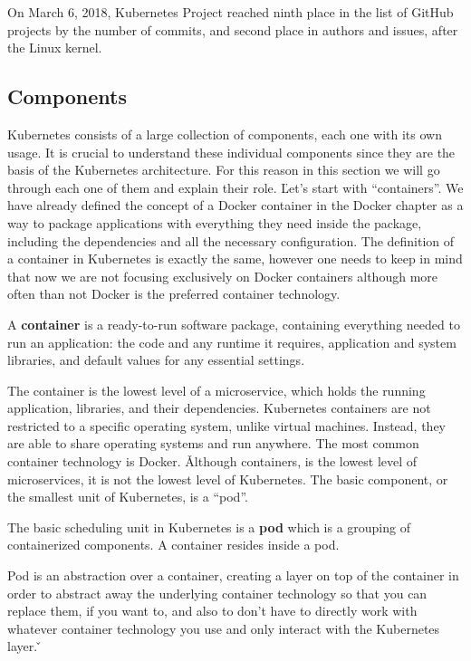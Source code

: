On March 6, 2018, Kubernetes Project reached ninth place in the list of GitHub projects by the number of commits, and
second place in authors and issues, after the Linux kernel.

\subsection{Components}

Kubernetes consists of a large collection of components, each one with its own usage. It is crucial to understand
these individual components since they are the basis of the Kubernetes architecture. For this reason in this section
we will go through each one of them and explain their role. \v

Let's start with ``containers''. We have already defined the concept of a Docker container in the Docker chapter as a
way to package applications with everything they need inside the package, including the dependencies and all the
necessary configuration. The definition of a container in Kubernetes is exactly the same, however one needs to keep
in mind that now we are not focusing exclusively on Docker containers although more often than not Docker is the
preferred container technology.

\bd[Container]
A \textbf{container} is a ready-to-run software package, containing everything needed to run an application: the
code and any runtime it requires, application and system libraries, and default values for any essential settings.
\ed


The container is the lowest level of a microservice, which holds the running application, libraries, and their
dependencies. Kubernetes containers are not restricted to a specific operating system, unlike virtual machines.
Instead, they are able to share operating systems and run anywhere. The most common container technology is Docker. \v

Although containers, is the lowest level of microservices, it is not the lowest level of Kubernetes. The basic
component, or the smallest unit of Kubernetes, is a ``pod''.

\bd[Pod]
The basic scheduling unit in Kubernetes is a \textbf{pod} which is a grouping of containerized components. A container
resides inside a pod.
\ed


Pod is an abstraction over a container, creating a layer on top of the container in order to abstract away the
underlying container technology so that you can replace them, if you want to, and also to don't have to directly work
with whatever container technology you use and only interact with the Kubernetes layer. \v

